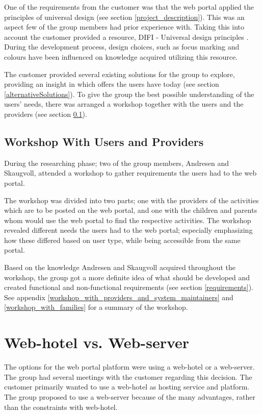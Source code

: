 One of the requirements from the customer was that the web portal applied the principles of universal design (see section \ref{project_description}). This was an aspect few of the group members had prior experience with. Taking this into account the customer provided a resource, DIFI - Universal design principles \cite{Difi}. During the development process, design choices, such as focus marking and colours have been influenced on knowledge acquired utilizing this resource. 

The customer provided several existing solutions  for the group to explore, providing an insight in which offers the users have today (see section \ref{alternativeSolutions}). To give the group the best possible understanding of the users' needs, there was arranged a workshop together with the users and the providers (see section \ref{WorkshopUserAndProviders}). 


\subsection{Workshop With Users and Providers}
\label{WorkshopUserAndProviders}
During the researching phase; two of the group members, Andresen and Skaugvoll, attended a workshop to gather requirements the users had to the web portal. 

The workshop was divided into two parts; one with the providers of the activities which are to be posted on the web portal, and one with the children and parents whom would use the web portal to find the respective activities. The workshop revealed different needs the users had to the web portal; especially emphasizing how these differed based on user type, while being accessible from the same portal. 

Based on the knowledge Andresen and Skaugvoll acquired throughout the workshop, the group got a more definite idea of what should be developed and created functional and non-functional requirements (see section \ref{requirements}). See appendix \ref{workshop_with_providers_and_system_maintainers} and \ref{workshop_with_families} for a summary of the workshop.

\section{Web-hotel vs. Web-server}
\label{webhotel_vs_webserver}
The options for the web portal platform were using a web-hotel or a web-server. The group had several meetings with the customer regarding this decision. The customer primarily wanted to use a web-hotel as hosting service and platform. The group proposed to use a web-server because of the many advantages, rather than the constraints with web-hotel. 

